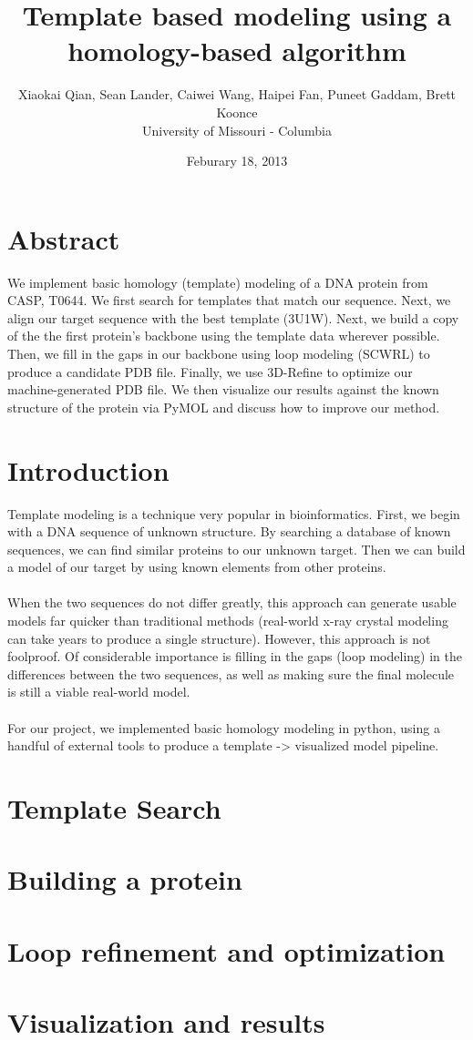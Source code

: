 \documentclass{article}
\title{Template based modeling using a homology-based algorithm}
\author{Xiaokai Qian, Sean Lander, Caiwei Wang, Haipei Fan, Puneet Gaddam, Brett Koonce\\University of Missouri - Columbia}
\date{Feburary 18, 2013}
\begin{document}
\maketitle

\section{Abstract}
We implement basic homology (template) modeling of a DNA protein from CASP, T0644.  We first search for templates that match our sequence.  Next, we align our target sequence with the best template (3U1W).  Next, we build a copy of the the first protein's backbone using the template data wherever possible.  Then, we fill in the gaps in our backbone using loop modeling (SCWRL) to produce a candidate PDB file.  Finally, we use 3D-Refine to optimize our machine-generated PDB file.  We then visualize our results against the known structure of the protein via PyMOL and discuss how to improve our method.

\section{Introduction}

Template modeling is a technique very popular in bioinformatics.  First, we begin with a DNA sequence of unknown structure.  By searching a database of known sequences, we can find similar proteins to our unknown target.  Then we can build a model of our target by using known elements from other proteins.\\\\
When the two sequences do not differ greatly, this approach can generate usable models far quicker than traditional methods (real-world x-ray crystal modeling can take years to produce a single structure).  However, this approach is not foolproof.  Of considerable importance is filling in the gaps (loop modeling) in the differences between the two sequences, as well as making sure the final molecule is still a viable real-world model.\\\\
For our project, we implemented basic homology modeling in python, using a handful of external tools to produce a template -> visualized model pipeline.

\section{Template Search}

\section{Building a protein}

\section{Loop refinement and optimization}

\section{Visualization and results}
\end{document}
